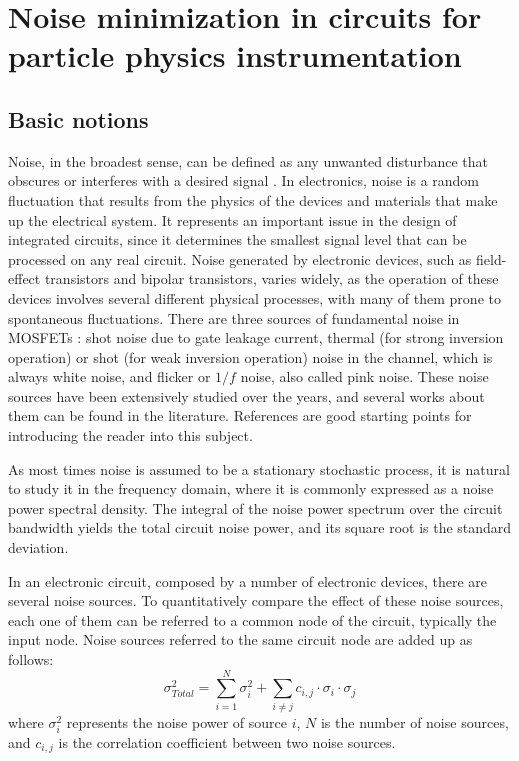 \section{Noise minimization in circuits for particle physics instrumentation}
\subsection{Basic notions}
Noise, in the broadest sense, can be defined as any unwanted disturbance that obscures or interferes with a desired signal \citep{motchenbacher}. In electronics, noise is a random fluctuation that results from the physics of the devices and materials that make up the electrical system. It represents an important issue in the design of integrated circuits, since it determines the smallest signal level that can be processed on any real circuit. Noise generated by electronic devices, such as field-effect transistors and bipolar transistors, varies widely, as the operation of these devices involves several different physical processes, with many of them prone to spontaneous fluctuations. There are three sources of fundamental noise in MOSFETs \citep{gray101}: shot noise due to gate leakage current, thermal (for strong inversion operation) or shot (for weak inversion operation) noise in the channel, which is always white noise, and flicker or $1/f$ noise, also called pink noise. These noise sources have been extensively studied over the years, and several works about them can be found in the literature. References \citep{gray101,jindal101} are good starting points for introducing the reader into this subject.

As most times noise is assumed to be a stationary stochastic process, it is natural to study it in the frequency domain, where it is commonly expressed as a noise power spectral density. The integral of the noise power spectrum over the circuit bandwidth yields the total circuit noise power, and its square root is the standard deviation.%

In an electronic circuit, composed by a number of electronic devices, there are several noise sources. To quantitatively compare the effect of these noise sources, each one of them can be referred to a common node of the circuit, typically the input node. Noise sources referred to the same circuit node are added up as follows:
\begin{equation}
\sigma^2_\textit{Total} = \sum_{i=1}^{N}\sigma^2_i + \sum_{i\neq j} c_{i,j} \cdot \sigma_i \cdot \sigma_j
\end{equation}
where $\sigma_i^2$ represents the noise power of source $i$, $N$ is the number of noise sources, and $c_{i,j}$ is the correlation coefficient between two noise sources.


